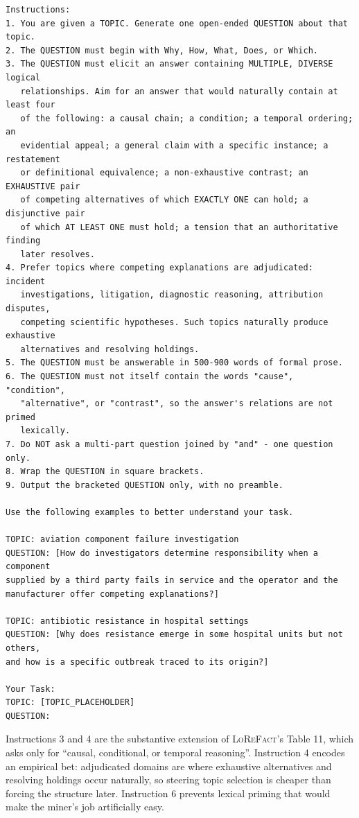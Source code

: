\documentclass[11pt]{article}
\begin{document}
\begin{small}
\begin{verbatim}
Instructions:
1. You are given a TOPIC. Generate one open-ended QUESTION about that topic.
2. The QUESTION must begin with Why, How, What, Does, or Which.
3. The QUESTION must elicit an answer containing MULTIPLE, DIVERSE logical
   relationships. Aim for an answer that would naturally contain at least four
   of the following: a causal chain; a condition; a temporal ordering; an
   evidential appeal; a general claim with a specific instance; a restatement
   or definitional equivalence; a non-exhaustive contrast; an EXHAUSTIVE pair
   of competing alternatives of which EXACTLY ONE can hold; a disjunctive pair
   of which AT LEAST ONE must hold; a tension that an authoritative finding
   later resolves.
4. Prefer topics where competing explanations are adjudicated: incident
   investigations, litigation, diagnostic reasoning, attribution disputes,
   competing scientific hypotheses. Such topics naturally produce exhaustive
   alternatives and resolving holdings.
5. The QUESTION must be answerable in 500-900 words of formal prose.
6. The QUESTION must not itself contain the words "cause", "condition",
   "alternative", or "contrast", so the answer's relations are not primed
   lexically.
7. Do NOT ask a multi-part question joined by "and" - one question only.
8. Wrap the QUESTION in square brackets.
9. Output the bracketed QUESTION only, with no preamble.

Use the following examples to better understand your task.

TOPIC: aviation component failure investigation
QUESTION: [How do investigators determine responsibility when a component
supplied by a third party fails in service and the operator and the
manufacturer offer competing explanations?]

TOPIC: antibiotic resistance in hospital settings
QUESTION: [Why does resistance emerge in some hospital units but not others,
and how is a specific outbreak traced to its origin?]

Your Task:
TOPIC: [TOPIC_PLACEHOLDER]
QUESTION:
\end{verbatim}
\end{small}

Instructions 3 and 4 are the substantive extension of \textsc{LoReFact}'s Table 11, which asks
only for ``causal, conditional, or temporal reasoning''. Instruction 4 encodes an empirical
bet: adjudicated domains are where exhaustive alternatives and resolving holdings occur
naturally, so steering topic selection is cheaper than forcing the structure later.
Instruction 6 prevents lexical priming that would make the miner's job artificially easy.
\end{document}
